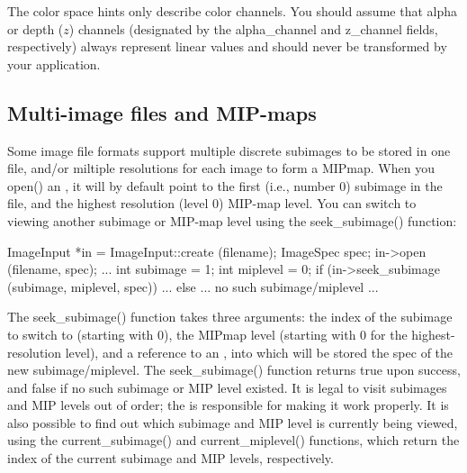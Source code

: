 The color space hints only describe color channels.  You should assume that
alpha or depth ($z$) channels (designated by the {\cf alpha_channel} and
{\cf z_channel} fields, respectively) always represent linear values and
should never be transformed by your application.


%


%


\subsection{Multi-image files and MIP-maps}
\label{sec:imageinput:multiimage}
\label{sec:imageinput:mipmap}

Some image file formats support multiple discrete subimages to be stored
in one file, and/or miltiple resolutions for each image to form a
MIPmap.  When you {\cf open()} an \ImageInput, it will by default point
to the first (i.e., number 0) subimage in the file, and the highest
resolution (level 0) MIP-map level.  You can switch to viewing another
subimage or MIP-map level using the {\cf seek_subimage()} function:

\begin{code}
        ImageInput *in = ImageInput::create (filename);
        ImageSpec spec;
        in->open (filename, spec);
        ...
        int subimage = 1;
        int miplevel = 0;
        if (in->seek_subimage (subimage, miplevel, spec)) {
            ...
        } else {
            ... no such subimage/miplevel ...
        }
\end{code}

The {\cf seek_subimage()} function takes three arguments: the index of
the subimage to switch to (starting with 0), the MIPmap level (starting
with 0 for the highest-resolution level), and a reference to an
\ImageSpec, into which will be stored the spec of the new
subimage/miplevel.  The {\cf seek_subimage()} function returns {\cf
  true} upon success, and {\cf false} if no such subimage or MIP level
existed.  It is legal to visit subimages and MIP levels out of order;
the \ImageInput is responsible for making it work properly.  It is also
possible to find out which subimage and MIP level is currently being
viewed, using the {\cf current_subimage()} and {\cf current_miplevel()}
functions, which return the index of the current subimage and MIP
levels, respectively.

